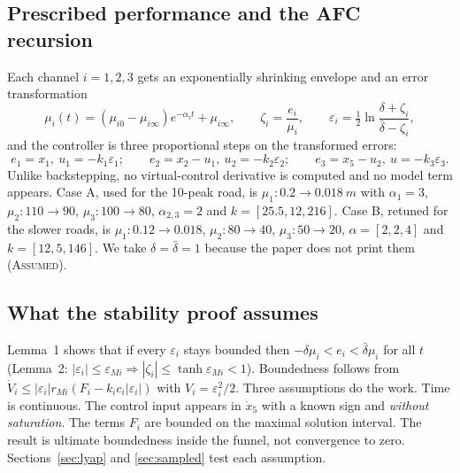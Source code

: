 \documentclass[10pt,a4paper]{article}
\newcommand{\evid}[1]{\textsc{#1}}
\begin{document}
\subsection{Prescribed performance and the AFC recursion}
Each channel \(i=1,2,3\) gets an exponentially shrinking envelope and an error transformation
\begin{equation}
\mu_i(t)=(\mu_{i0}-\mu_{i\infty})e^{-\alpha_it}+\mu_{i\infty},\qquad \zeta_i=\frac{e_i}{\mu_i},\qquad \varepsilon_i=\tfrac12\ln\frac{\delta+\zeta_i}{\bar\delta-\zeta_i},
\end{equation}
and the controller is three proportional steps on the transformed errors:
\begin{equation}
e_1=x_1,\ u_1=-k_1\varepsilon_1;\qquad e_2=x_2-u_1,\ u_2=-k_2\varepsilon_2;\qquad e_3=x_5-u_2,\ u=-k_3\varepsilon_3 .
\end{equation}
Unlike backstepping, no virtual-control derivative is computed and no model term appears. Case A, used for the 10-peak road, is \(\mu_1:0.2\to\SI{0.018}{m}\) with \(\alpha_1=3\), \(\mu_2:110\to90\), \(\mu_3:100\to80\), \(\alpha_{2,3}=2\) and \(k=[25.5,12,216]\). Case B, retuned for the slower roads, is \(\mu_1:0.12\to0.018\), \(\mu_2:80\to40\), \(\mu_3:50\to20\), \(\alpha=[2,2,4]\) and \(k=[12,5,146]\). We take \(\delta=\bar\delta=1\) because the paper does not print them (\evid{Assumed}).

\subsection{What the stability proof assumes}
Lemma~1 shows that if every \(\varepsilon_i\) stays bounded then \(-\delta\mu_i<e_i<\bar\delta\mu_i\) for all \(t\) (Lemma~2: \(|\varepsilon_i|\le\varepsilon_{Mi}\Rightarrow|\zeta_i|\le\tanh\varepsilon_{Mi}<1\)). Boundedness follows from \(\dot V_i\le|\varepsilon_i|r_{Mi}(F_i-k_i c_i|\varepsilon_i|)\) with \(V_i=\varepsilon_i^2/2\). Three assumptions do the work. Time is continuous. The control input appears in \(\dot x_5\) with a known sign and \emph{without saturation}. The terms \(F_i\) are bounded on the maximal solution interval. The result is ultimate boundedness inside the funnel, not convergence to zero. Sections~\ref{sec:lyap} and \ref{sec:sampled} test each assumption.
\end{document}
